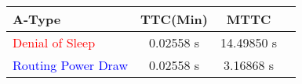 	\begin{tabular}{| l | c | c | r |}
	\hline
	\textbf{A-Type} & \textbf{TTC(Min)} & \textbf{MTTC}\\
	\hline
	\hline
	\textcolor{red}{Denial of Sleep} &  0.02558 s & 14.49850 s\\
	\hline
	\textcolor{blue}{Routing Power Draw} &  0.02558 s & 3.16868 s\\
	\hline
	\end{tabular}